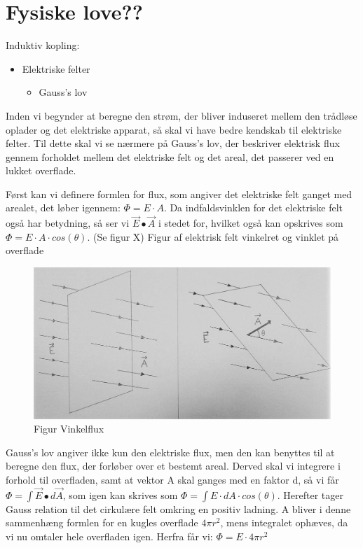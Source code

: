 \newpage

\section{Fysiske love??}
Induktiv kopling:
\begin{itemize}
\item Elektriske felter
\begin{itemize}
\item Gauss's lov
\end{itemize}
\end{itemize}

Inden vi begynder at beregne den strøm, der bliver induseret mellem den trådløse oplader og det elektriske apparat, så skal vi have bedre kendskab til elektriske felter. Til dette skal vi se nærmere på Gauss's lov, der beskriver elektrisk flux gennem forholdet mellem det elektriske felt og det areal, det passerer ved en lukket overflade.

Først kan vi definere formlen for flux, som angiver det elektriske felt ganget med arealet, det løber igennem: $\Phi = E \cdot A$. Da indfaldsvinklen for det elektriske felt også har betydning, så ser vi $\vec{E} \bullet \vec{A}$ i stedet for, hvilket også kan opskrives som $\Phi = E \cdot A \cdot cos(\theta)$. (Se figur X)
Figur af elektrisk felt vinkelret og vinklet på overflade

\begin{figure}[H]
\centering
\includegraphics[scale=0.5]{../Vildledning/Schematics/vinkelflux.jpg}
\caption{Figur Vinkelflux}
\end{figure}

Gauss's lov angiver ikke kun den elektriske flux, men den kan benyttes til at beregne den flux, der forløber over et bestemt areal. Derved skal vi integrere i forhold til overfladen, samt at vektor A skal ganges med en faktor d, så vi får $\Phi = \int \vec{E} \bullet d \vec{A}$, som igen kan skrives som $\Phi = \int E \cdot dA \cdot cos(\theta)$. Herefter tager Gauss relation til det cirkulære felt omkring en positiv ladning. A bliver i denne sammenhæng formlen for en kugles overflade $4 \pi r^2$, mens integralet ophæves, da vi nu omtaler hele overfladen igen. Herfra får vi: $\Phi = E \cdot 4 \pi r^2$

